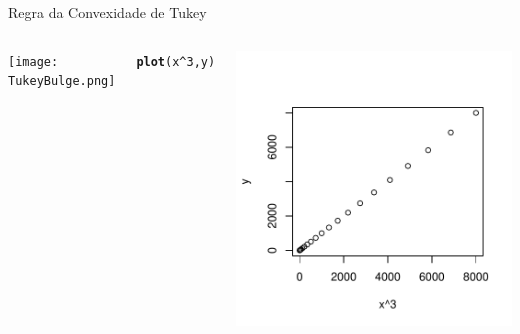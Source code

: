 \documentclass{beamer}\usepackage[]{graphicx}\usepackage[]{color}
\makeatletter
\newcommand{\hlnum}[1]{\textcolor[rgb]{0.686,0.059,0.569}{#1}}%
\newcommand{\hlopt}[1]{\textcolor[rgb]{0,0,0}{#1}}%
\newcommand{\hlstd}[1]{\textcolor[rgb]{0.345,0.345,0.345}{#1}}%
\newcommand{\hlkwd}[1]{\textcolor[rgb]{0.737,0.353,0.396}{\textbf{#1}}}%
\newenvironment{kframe}{%
 \def\at@end@of@kframe{}%
 \ifinner\ifhmode%
  \def\at@end@of@kframe{\end{minipage}}%
  \begin{minipage}{\columnwidth}%
 \fi\fi%
 \def\FrameCommand##1{\hskip\@totalleftmargin \hskip-\fboxsep
 \colorbox{shadecolor}{##1}\hskip-\fboxsep
     \hskip-\linewidth \hskip-\@totalleftmargin \hskip\columnwidth}%
 \MakeFramed {\advance\hsize-\width
   \@totalleftmargin\z@ \linewidth\hsize
   \@setminipage}}%
 {\par\unskip\endMakeFramed%
 \at@end@of@kframe}
\newenvironment{knitrout}{}{} %
\renewenvironment{knitrout}{\setlength{\topsep}{0mm}}{}
\makeatother
\begin{document}
\begin{frame}{Regra da Convexidade de Tukey}

\begin{columns}[c]

\centering
\texttt{[image: TukeyBulge.png]}

\centering
\begin{knitrout}\scriptsize
{}\color{fgcolor}\begin{kframe}
\begin{alltt}
\hlkwd{plot}\hlstd{(x}\hlopt{^}\hlnum{3}\hlstd{,y)}
\end{alltt}
\end{kframe}
\includegraphics[width=0.7\linewidth]{figure/rem5-1} 

\end{knitrout}

\end{columns}

\end{frame}
\end{document}
